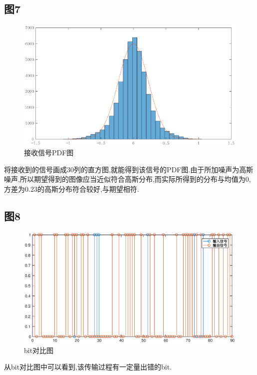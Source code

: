 \documentclass[UTF8]{article}
\begin{document}
\begin{CJK}{UTF8}{gkai}
\subsection{图7}
\begin{figure}[H]
    \centering
    \includegraphics[scale=0.7]{plot7.eps}
    \caption{接收信号PDF图}
    \label{blocks}
\end{figure}
将接收到的信号画成30列的直方图,就能得到该信号的PDF图.由于所加噪声为高斯噪声,所以期望得到的图像应当近似符合高斯分布,而实际所得到的分布与均值为0,方差为0.23的高斯分布符合较好,与期望相符.
\subsection{图8}
\begin{figure}[H]
    \centering
    \includegraphics[scale=0.7]{plot9.eps}
    \caption{bit对比图}
    \label{blocks}
\end{figure}
从bit对比图中可以看到,该传输过程有一定量出错的bit.

\end{CJK}
\end{document}
